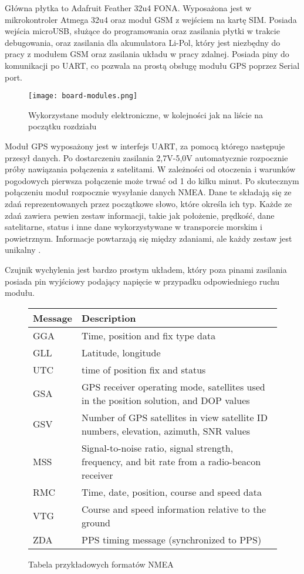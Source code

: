 \documentclass[eng,printmode]{mgr}
\begin{document}
Główna płytka to Adafruit Feather 32u4 FONA. Wyposażona jest w mikrokontroler Atmega 32u4 oraz moduł GSM z wejściem na kartę SIM. Posiada wejścia microUSB, służące do programowania oraz zasilania płytki w trakcie debugowania, oraz zasilania dla akumulatora Li-Pol, który jest niezbędny do pracy z modułem GSM oraz zasilania układu w pracy zdalnej. Posiada piny do komunikacji po UART, co pozwala na prostą obsługę modułu GPS poprzez Serial port.

\begin{figure}
\centering
\texttt{[image: board-modules.png]}
\caption{Wykorzystane moduły elektroniczne, w kolejności jak na liście na początku rozdziału}
\end{figure}

Moduł GPS wyposażony jest w interfejs UART, za pomocą którego następuje przesył danych. Po dostarczeniu zasilania 2,7V-5,0V automatycznie rozpocznie próby nawiązania połączenia z satelitami. W zależności od otoczenia i warunków pogodowych pierwsza połączenie może trwać od 1 do kilku minut. Po skutecznym połączeniu moduł rozpocznie wysyłanie danych NMEA. Dane te składają się ze zdań reprezentowanych przez początkowe słowo, które określa ich typ. Każde ze zdań zawiera pewien zestaw informacji, takie jak położenie, prędkość, dane satelitarne, status i inne dane wykorzystywane w transporcie morskim i powietrznym. Informacje powtarzają się między zdaniami, ale każdy zestaw jest unikalny \cite{nmea}.

Czujnik wychylenia jest bardzo prostym układem, który poza pinami zasilania posiada pin wyjściowy podający napięcie w przypadku odpowiedniego ruchu modułu.

\begin{figure}

\begin{center}
    \begin{tabular}{ | p{2cm} | p{13cm} |}
    \hline
    Message & Description \\ \hline
    GGA & Time, position and fix type data \\
    GLL & Latitude, longitude\\
    UTC & time of position fix and status \\
    GSA & GPS receiver operating mode, satellites used in the position solution, and DOP values \\
    GSV & Number of GPS satellites in view satellite ID numbers, elevation, azimuth, SNR values \\
    MSS & Signal-to-noise ratio, signal strength, frequency, and bit rate from a radio-beacon receiver \\
    RMC & Time, date, position, course and speed data \\
    VTG & Course and speed information relative to the ground \\
    ZDA & PPS timing message (synchronized to PPS) \\

    \hline
    \end{tabular}
    \end{center}
	\caption{Tabela przykładowych formatów NMEA \cite{nmea_table}}
\end{figure}
\end{document}
